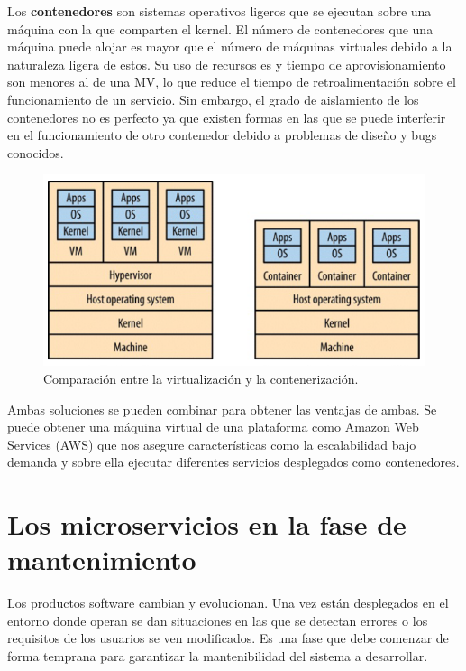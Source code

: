 \documentclass[11pt,spanish,listoffigures]{tfgetsinf}
\begin{document}
Los \textbf{contenedores} son sistemas operativos ligeros que se ejecutan sobre una máquina con la que comparten el kernel. El número de contenedores que una máquina puede alojar es mayor que el número de máquinas virtuales debido a la naturaleza ligera de estos. \cite{Dua2014} Su uso de recursos es y tiempo de aprovisionamiento son menores al de una MV, lo que reduce el tiempo de retroalimentación sobre el funcionamiento de un servicio. Sin embargo, el grado de aislamiento de los contenedores no es perfecto ya que existen formas en las que se puede interferir en el funcionamiento de otro contenedor debido a problemas de diseño y bugs conocidos. \cite{Newman2015a}

\begin{figure}[h]
\centering
\includegraphics[scale=0.8]{containers_vms}
\caption{Comparación entre la virtualización y la contenerización. \cite{Newman2015a}}
\end{figure}

Ambas soluciones se pueden combinar para obtener las ventajas de ambas. Se puede obtener una máquina virtual de una plataforma como Amazon Web Services (AWS) que nos asegure características como la escalabilidad bajo demanda y sobre ella ejecutar diferentes servicios desplegados como contenedores.

\section{Los microservicios en la fase de mantenimiento}

Los productos software cambian y evolucionan. Una vez están desplegados en el entorno donde operan se dan situaciones en las que se detectan errores o los requisitos de los usuarios se ven modificados. Es una fase que debe comenzar de forma temprana para garantizar la mantenibilidad del sistema a desarrollar. \cite{Bourque2014}
\end{document}
